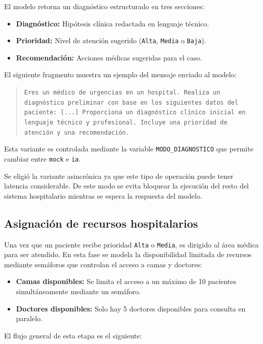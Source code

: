 \documentclass{article}
\begin{document}
El modelo retorna un diagnóstico estructurado en tres secciones:
\begin{itemize}
    \item \textbf{Diagnóstico:} Hipótesis clínica redactada en lenguaje técnico.
    \item \textbf{Prioridad:} Nivel de atención sugerido (\texttt{Alta}, \texttt{Media} o \texttt{Baja}).
    \item \textbf{Recomendación:} Acciones médicas sugeridas para el caso.
\end{itemize}

El siguiente fragmento muestra un ejemplo del mensaje enviado al modelo:

\begin{quote}
\texttt{Eres un médico de urgencias en un hospital. Realiza un diagnóstico preliminar con base en los siguientes datos del paciente: [...] Proporciona un diagnóstico clínico inicial en lenguaje técnico y profesional. Incluye una prioridad de atención y una recomendación.}
\end{quote}

Esta variante es controlada mediante la variable \texttt{MODO\_DIAGNOSTICO} que permite cambiar entre \texttt{mock} e \texttt{ia}.

Se eligió la variante asincrónica ya que este tipo de operación puede tener latencia considerable. De este modo se evita bloquear la ejecución del resto del sistema hospitalario mientras se espera la respuesta del modelo.

\subsection{Asignación de recursos hospitalarios}

Una vez que un paciente recibe prioridad \texttt{Alta} o \texttt{Media}, es dirigido al área médica para ser atendido. En esta fase se modela la disponibilidad limitada de recursos mediante semáforos que controlan el acceso a camas y doctores:

\begin{itemize}
    \item \textbf{Camas disponibles:} Se limita el acceso a un máximo de 10 pacientes simultáneamente mediante un semáforo.
    \item \textbf{Doctores disponibles:} Solo hay 5 doctores disponibles para consulta en paralelo.
\end{itemize}

El flujo general de esta etapa es el siguiente:
\end{document}
